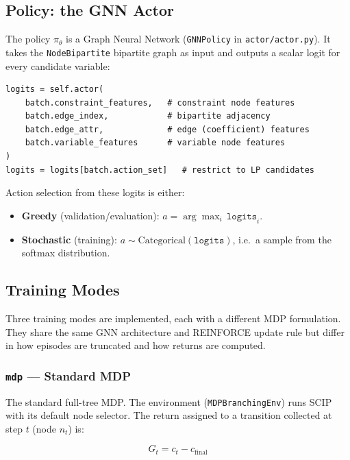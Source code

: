 \subsection{Policy: the GNN Actor}

The policy $\pi_\theta$ is a Graph Neural Network (\texttt{GNNPolicy} in \texttt{actor/actor.py}). It takes the \texttt{NodeBipartite} bipartite graph as input and outputs a scalar logit for every candidate variable:

\begin{lstlisting}
logits = self.actor(
    batch.constraint_features,   # constraint node features
    batch.edge_index,            # bipartite adjacency
    batch.edge_attr,             # edge (coefficient) features
    batch.variable_features      # variable node features
)
logits = logits[batch.action_set]   # restrict to LP candidates
\end{lstlisting}

Action selection from these logits is either:
\begin{itemize}
    \item \textbf{Greedy} (validation/evaluation): $a = \arg\max_i \, \texttt{logits}_i$.
    \item \textbf{Stochastic} (training): $a \sim \mathrm{Categorical}(\texttt{logits})$, i.e.\ a sample from the softmax distribution.
\end{itemize}

\subsection{Training Modes}
\label{sec:training_modes}

Three training modes are implemented, each with a different MDP formulation. They share the same GNN architecture and REINFORCE update rule but differ in how episodes are truncated and how returns are computed.

\subsubsection{\texttt{mdp} --- Standard MDP}

The standard full-tree MDP. The environment (\texttt{MDPBranchingEnv}) runs SCIP with its default node selector. The return assigned to a transition collected at step $t$ (node $n_t$) is:

\[
    G_t = c_{t} - c_{\text{final}}
\]

